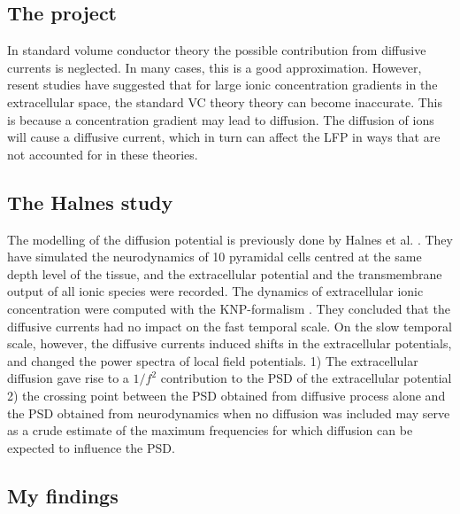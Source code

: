 \documentclass{article}
\begin{document}
\subsection{The project}
In standard volume conductor theory the possible contribution from diffusive currents is neglected. In many cases, this is a good approximation. However, resent studies have suggested that for large ionic concentration gradients in the extracellular space, the standard VC theory theory can become inaccurate. This is because a concentration gradient may lead to diffusion. The diffusion of ions will cause a diffusive current, which in turn can affect the LFP in ways that are not accounted for in these theories.  
\subsection{The Halnes study}
The modelling of the diffusion potential is previously done by Halnes et al. \cite{Halnes2016}. They have simulated the neurodynamics of 10 pyramidal cells centred at the same depth level of the tissue, and the extracellular potential and the transmembrane output of all ionic species were recorded. The dynamics of extracellular ionic concentration were computed with the KNP-formalism \cite{Halnes}. They concluded that the diffusive currents had no impact on the fast temporal scale. On the slow temporal scale, however, the diffusive currents induced shifts in the extracellular potentials, and changed the power spectra of local field potentials.  1) The extracellular diffusion gave rise to a $1/f^2$ contribution to the PSD of the extracellular potential 2) the crossing point between the PSD obtained from diffusive process alone and the PSD obtained from neurodynamics when no diffusion was included may serve as a crude estimate of the maximum frequencies for which diffusion can be expected to influence the PSD. 

\subsection{My findings}
\end{document}
